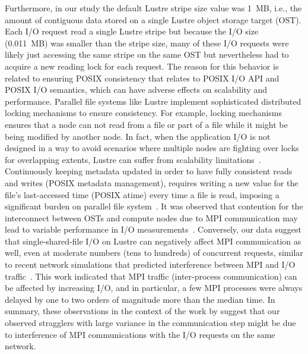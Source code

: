 Furthermore, in our study the default Lustre stripe size value was 1~MB, i.e., the amount of contiguous data stored on a single Lustre object storage target (OST).
Each I/O request read a single Lustre stripe but because the I/O size (0.011~MB) was smaller than the stripe size, many of these I/O requests were likely just accessing the same stripe on the same OST but nevertheless had to acquire a new reading lock for each request.
The reason for this behavior is related to ensuring POSIX consistency that relates to POSIX I/O API and POSIX I/O semantics, which can have adverse effects on scalability and performance.
Parallel file systems like Lustre implement sophisticated distributed locking mechanisms to ensure consistency.
For example, locking mechanisms ensures that a node can not read from a file or part of a file while it might be being modified by another node. 
In fact, when the application I/O is not designed in a way to avoid scenarios where multiple nodes are fighting over locks for overlapping extents, Lustre can suffer from scalability limitations~\cite{optimize_lustre}.
Continuously keeping metadata updated in order to have fully consistent reads and writes (POSIX metadata management), requires writing a new value for the file's last-accessed time (POSIX atime) every time a file is read, imposing a significant burden on parallel file system~\cite{POSIX2017}. 
It was observed that contention for the interconnect between OSTs and compute nodes due to MPI communication may lead to variable performance in I/O measurements~\cite{Mache:2005aa}.
Conversely, our data suggest that single-shared-file I/O on Lustre can negatively affect MPI communication as well, even at moderate numbers (tens to hundreds) of concurrent requests, similar to recent network simulations that predicted interference between MPI and I/O traffic~\cite{Brown:2018ab}.
This work indicated that MPI traffic (inter-process communication) can be affected by increasing I/O, and in particular, a few MPI processes were always delayed by one to two orders of magnitude more than the median time.
In summary, these observations in the context of the work by \citet{Brown:2018ab} suggest that our observed stragglers with large variance in the communication step might be due to interference of MPI communications with the I/O requests on the same network.

